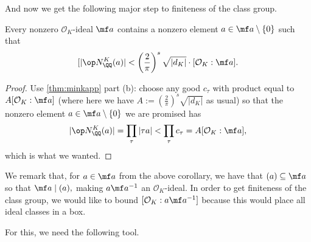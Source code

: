 And now we get the following major step to finiteness of the class group.
\begin{corollary}
    Every nonzero $\mathcal O_K$-ideal $\mf a$ contains a nonzero element $a\in\mf a\setminus\{0\}$ such that
    \[[|\op N_\QQ^K(a)|<\left(\frac2\pi\right)^s\sqrt{|d_K|}\cdot[\mathcal O_K:\mf a].\]
\end{corollary}
\begin{proof}
    Use \autoref{thm:minkapp} part (b): choose any good $c_\tau$ with product equal to $A[\mathcal O_K:\mf a]$ (where here we have $A:=\left(\frac2\pi\right)^s\sqrt{|d_K|}$ as usual) so that the nonzero element $a\in\mf a\setminus\{0\}$ we are promised has
    \[|\op N_\QQ^K(a)|=\prod_\tau|\tau a|<\prod_\tau c_\tau=A[\mathcal O_K:\mf a],\]
    which is what we wanted.
\end{proof}
We remark that, for $a\in\mf a$ from the above corollary, we have that $(a)\subseteq\mf a$ so that $\mf a\mid(a),$ making $a\mf a^{-1}$ an $\mathcal O_K$-ideal. In order to get finiteness of the class group, we would like to bound $[\mathcal O_K:a\mf a^{-1}]$ because this would place all ideal classes in a box.

For this, we need the following tool.
